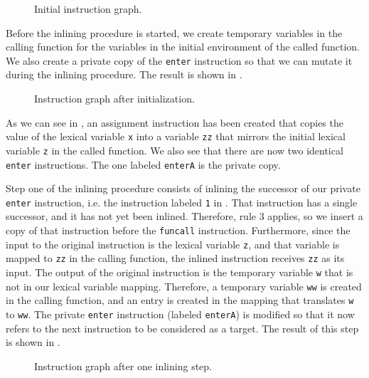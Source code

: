 \begin{figure}
\begin{center}
\end{center}
\caption{\label{fig41}
Initial instruction graph.}
\end{figure}

Before the inlining procedure is started, we create temporary
variables in the calling function for the variables in the initial
environment of the called function.  We also create a private copy of
the \texttt{enter} instruction so that we can mutate it during the
inlining procedure.  The result is shown in .

\begin{figure}
\begin{center}
\end{center}
\caption{\label{fig42}
Instruction graph after initialization.}
\end{figure}

As we can see in , an assignment instruction has been
created that copies the value of the lexical variable \texttt{x} into
a variable \texttt{zz} that mirrors the initial lexical variable
\texttt{z} in the called function.  We also see that there are now two
identical \texttt{enter} instructions.  The one labeled
\texttt{enterA} is the private copy.

Step one of the inlining procedure consists of inlining the successor
of our private \texttt{enter} instruction, i.e. the instruction
labeled \texttt{1} in .  That instruction has a single
successor, and it has not yet been inlined.  Therefore, rule 3
applies, so we insert a copy of that instruction before the
\texttt{funcall} instruction.  Furthermore, since the input to the
original instruction is the lexical variable \texttt{z}, and that
variable is mapped to \texttt{zz} in the calling function, the inlined
instruction receives \texttt{zz} as its input.  The output of the
original instruction is the temporary variable \texttt{w} that is not
in our lexical variable mapping.  Therefore, a temporary variable
\texttt{ww} is created in the calling function, and an entry is
created in the mapping that translates \texttt{w} to \texttt{ww}.  The
private \texttt{enter} instruction (labeled \texttt{enterA}) is
modified so that it now refers to the next instruction to be
considered as a target.  The result of this step is shown in
.

\begin{figure}
\begin{center}
\end{center}
\caption{\label{fig43}
Instruction graph after one inlining step.}
\end{figure}

